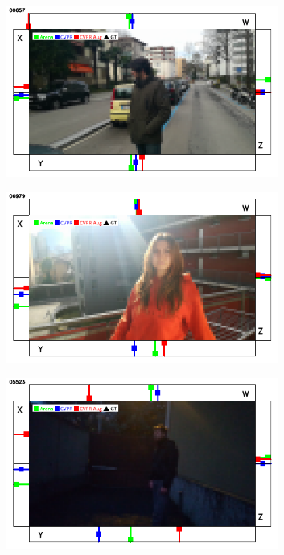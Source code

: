 \begin{figure}[H]
\begin{center}
\begin{subfigure}[h]{0.49\textwidth}
		\end{subfigure}
		\hfill
		\begin{subfigure}[h]{0.49\textwidth}
			\centering
			\includegraphics[width=0.98\textwidth]{"contents/images/qualitative-videos/perfect3-street01-657"}
		\end{subfigure}
		\vfill
		\begin{subfigure}[h]{0.49\textwidth}
			\centering
			\includegraphics[width=0.98\textwidth]{"contents/images/qualitative-videos/perfect4-house01-6979"}
		\end{subfigure}
		\hfill
		\begin{subfigure}[h]{0.49\textwidth}
			\centering
			\includegraphics[width=0.98\textwidth]{"contents/images/qualitative-videos/dark-courtyard02-5523"}

\end{subfigure}
\end{center}
\end{figure}

